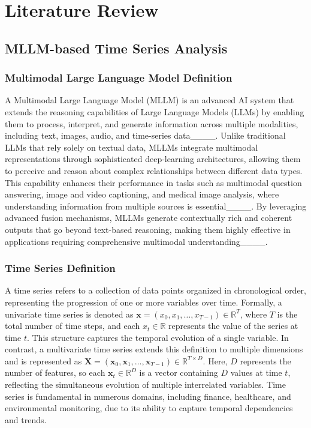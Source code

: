 \section{Literature Review}
\label{appendix1}

\subsection{MLLM-based Time Series Analysis}

\subsubsection{Multimodal Large Language Model Definition}
A Multimodal Large Language Model (MLLM) is an advanced AI system that extends the reasoning capabilities of Large Language Models (LLMs) by enabling them to process, interpret, and generate information across multiple modalities, including text, images, audio, and time-series data____. Unlike traditional LLMs that rely solely on textual data, MLLMs integrate multimodal representations through sophisticated deep-learning architectures, allowing them to perceive and reason about complex relationships between different data types. This capability enhances their performance in tasks such as multimodal question answering, image and video captioning, and medical image analysis, where understanding information from multiple sources is essential____. By leveraging advanced fusion mechanisms, MLLMs generate contextually rich and coherent outputs that go beyond text-based reasoning, making them highly effective in applications requiring comprehensive multimodal understanding____.

\subsubsection{Time Series Definition} 
A time series refers to a collection of data points organized in chronological order, representing the progression of one or more variables over time. Formally, a univariate time series is denoted as $\mathbf{x} = (x_0, x_1, \dots, x_{T-1}) \in \mathbb{R}^{T}$, where $T$ is the total number of time steps, and each $x_t \in \mathbb{R}$ represents the value of the series at time $t$. This structure captures the temporal evolution of a single variable. In contrast, a multivariate time series extends this definition to multiple dimensions and is represented as $\mathbf{X} = (\mathbf{x}_0, \mathbf{x}_1, \dots, \mathbf{x}_{T-1}) \in \mathbb{R}^{T \times D}$. Here, $D$ represents the number of features, so each $\mathbf{x}_t \in \mathbb{R}^D$ is a vector containing $D$ values at time $t$, reflecting the simultaneous evolution of multiple interrelated variables. Time series is fundamental in numerous domains, including finance, healthcare, and environmental monitoring, due to its ability to capture temporal dependencies and trends.

